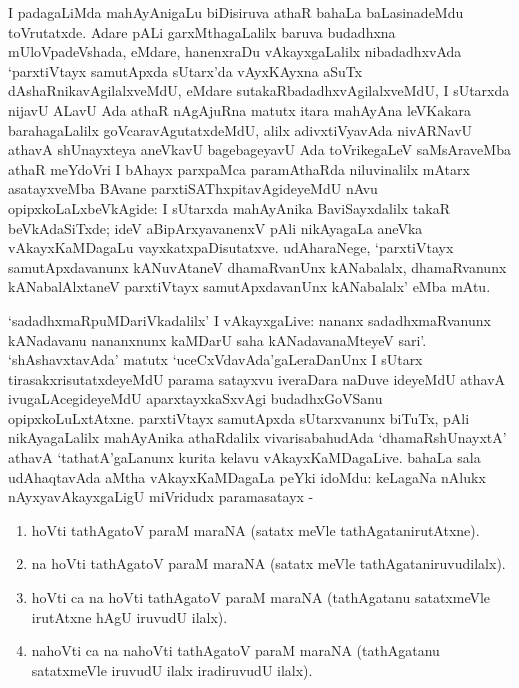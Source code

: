 I padagaLiMda mahAyAnigaLu biDisiruva athaR bahaLa baLasinadeMdu toVrutatxde. Adare pALi garxMthagaLalilx baruva budadhxna mUloVpadeVshada, eMdare, hanenxraDu vAkayxgaLalilx nibadadhxvAda `parxtiVtayx samutApxda sUtarx'da vAyxKAyxna aSuTx dAshaRnikavAgilalxveMdU, eMdare sutakaRbadadhxvAgilalxveMdU, I sUtarxda nijavU ALavU Ada athaR nAgAjuRna matutx itara mahAyAna leVKakara barahagaLalilx goVcaravAgutatxdeMdU, alilx adivxtiVyavAda nivARNavU athavA shUnayxteya aneVkavU bagebageyavU Ada toVrikegaLeV saMsAraveMba athaR meYdoVri I bAhayx parxpaMca paramAthaRda niluvinalilx mAtarx asatayxveMba BAvane parxtiSAThxpitavAgideyeMdU nAvu opipxkoLaLxbeVkAgide: I sUtarxda mahAyAnika BaviSayxdalilx takaR beVkAdaSiTxde; ideV aBipArxyavanenxV pAli nikAyagaLa aneVka vAkayxKaMDagaLu vayxkatxpaDisutatxve. udAharaNege, `parxtiVtayx samutApxdavanunx kANuvAtaneV  dhamaRvanUnx kANabalalx, dhamaRvanunx kANabalAlxtaneV parxtiVtayx samutApxdavanUnx kANabalalx' eMba mAtu.

`sadadhxmaRpuMDariVkadalilx' I vAkayxgaLive: nananx sadadhxmaRvanunx kANadavanu nananxnunx kaMDarU saha kANadavanaMteyeV sari'. `shAshavxtavAda' matutx `uceCxVdavAda'gaLera\-DanUnx I sUtarx tirasakxrisutatxdeyeMdU parama satayxvu iveraDara naDuve ideyeMdU athavA ivugaLAcegideyeMdU aparxtayxkaSxvAgi budadhxGoVSanu opipxkoLuLxtAtxne. parxtiVtayx samutApxda sUtarxvanunx biTuTx, pAli nikAyagaLalilx mahAyAnika athaRdalilx vivarisabahudAda `dhamaRshUnayxtA' athavA `tathatA'gaLanunx kurita kelavu vAkayxKaMDa\-gaLive. bahaLa sala udAhaqtavAda aMtha vAkayxKaMDagaLa peYki idoMdu: keLagaNa nAlukx nAyxyavAkayxgaLigU miVridudx paramasatayx -
\begin{enumerate}
\renewcommand{\theenumi}{\arabic{enumi}}
\renewcommand{\labelenumi}{(\theenumi)}
\itemsep=0pt
\item hoVti tathAgatoV paraM maraNA (satatx meVle tathAgatanirutAtxne).
\item na hoVti tathAgatoV paraM maraNA (satatx meVle tathAgataniruvudilalx).
\item hoVti ca na hoVti tathAgatoV paraM maraNA (tathAgatanu satatxmeVle irutAtxne hAgU iruvudU ilalx).
\item nahoVti ca na nahoVti tathAgatoV paraM maraNA (tathAgatanu satatxmeVle iruvudU ilalx iradiruvudU ilalx).
\end{enumerate}

